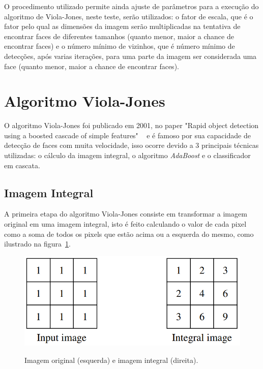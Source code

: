 O procedimento utilizado permite ainda ajuste de parâmetros para a execução do algoritmo de Viola-Jones, neste teste, serão utilizados: o fator de escala, que é o fator pelo qual as dimensões da imagem serão multiplicadas na tentativa de encontrar faces de diferentes tamanhos (quanto menor, maior a chance de encontrar faces) e o número mínimo de vizinhos, que é número mínimo de detecções, após varias iterações, para uma parte da imagem ser considerada uma face (quanto menor, maior a chance de encontrar faces).

\section{Algoritmo Viola-Jones}

O algoritmo Viola-Jones foi publicado em 2001, no paper "Rapid object detection using a boosted cascade of simple features" ~\cite{paper-viola-jones} e é famoso por sua capacidade de detecção de faces com muita velocidade, isso ocorre devido a 3 principais técnicas utilizadas: o cálculo da imagem integral, o algoritmo \textit{AdaBoost} e o classificador em cascata.

\subsection{Imagem Integral} 

A primeira etapa do algoritmo Viola-Jones consiste em transformar a imagem original em uma imagem integral, isto é feito calculando o valor de cada pixel como a soma de todos os pixels que estão acima ou a esquerda do mesmo, como ilustrado na figura~\ref{fig:integral}.

\begin{figure}[htpb]
    \centering
    \caption{Imagem original (esquerda) e imagem integral (direita).}
    \includegraphics[scale=.4]{figs/imagem-integral.png}
    \label{fig:integral}
 \end{figure}


